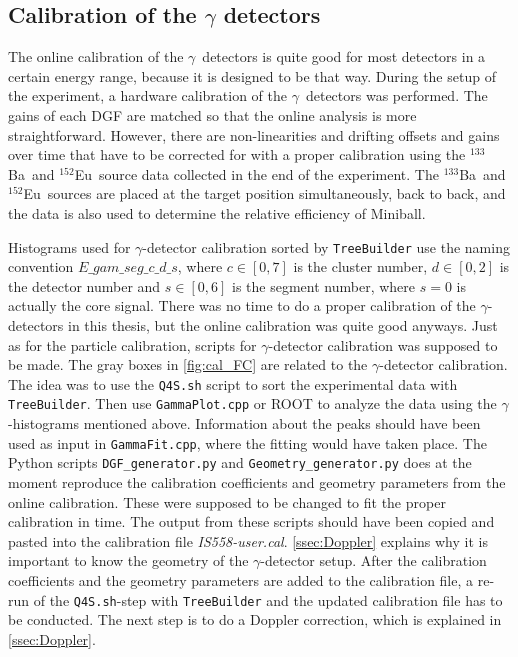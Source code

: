 \documentclass[twoside,english]{uiofysmaster/uiofysmaster}
\newcommand{\ga}{$\gamma$}
\newcommand{\Ba}{$^{133}$Ba}
\newcommand{\Eu}{$^{152}$Eu}
\let\orgautoref\autoref
\renewcommand{\autoref}
        {%
		 \def\subsectionautorefname{Section}%
		 \def\subsubsectionautorefname{Section}%
          \orgautoref}
\begin{document}
\subsection{Calibration of the \texorpdfstring{$\gamma$}{gamma} detectors}\label{ssec:gamma}
The online calibration of the \ga\ detectors is quite good for most detectors in a certain energy range, because it is designed to be that way. 
During the setup of the experiment, a hardware calibration of the \ga\ detectors was performed. 
The gains of each DGF are matched so that the online analysis is more straightforward.
However, there are non-linearities and drifting offsets and gains over time that have to be corrected for with a proper calibration using the \Ba\ and \Eu\ source data collected in the end of the experiment. The \Ba\ and \Eu\ sources are placed at the target position simultaneously, back to back, and the data is also used to determine the relative efficiency of Miniball. 

Histograms used for \ga-detector calibration sorted by \texttt{TreeBuilder} use the naming convention $\textit{E\_gam\_seg}\_c\_d\_s$, where $c \in [0, 7]$ is the cluster number, $d \in [0, 2]$ is the detector number and $s \in [0, 6]$ is the segment number, where $s = 0$ is actually the core signal.
There was no time to do a proper calibration of the \ga-detectors in this thesis, but the online calibration was quite good anyways.
Just as for the particle calibration, scripts for \ga-detector calibration was supposed to be made. 
The gray boxes in \autoref{fig:cal_FC} are related to the \ga-detector calibration. 
The idea was to use the \texttt{Q4S.sh} script to sort the experimental data with \texttt{TreeBuilder}.
Then use \texttt{GammaPlot.cpp} or ROOT to analyze the data using the \ga-histograms mentioned above. 
Information about the peaks should have been used as input in \texttt{GammaFit.cpp}, where the fitting would have taken place. 
The Python scripts \texttt{DGF\_generator.py} and \texttt{Geometry\_generator.py} does at the moment reproduce the calibration coefficients and geometry parameters from the online calibration. 
These were supposed to be changed to fit the proper calibration in time.  
The output from these scripts should have been copied and pasted into the calibration file \textit{IS558-user.cal}.
\autoref{ssec:Doppler} explains why it is important to know the geometry of the \ga-detector setup.
After the calibration coefficients and the geometry parameters are added to the calibration file, a re-run of the \texttt{Q4S.sh}-step with \texttt{TreeBuilder} and the updated calibration file has to be conducted. 
The next step is to do a Doppler correction, which is explained in  
\autoref{ssec:Doppler}. 
\end{document}
